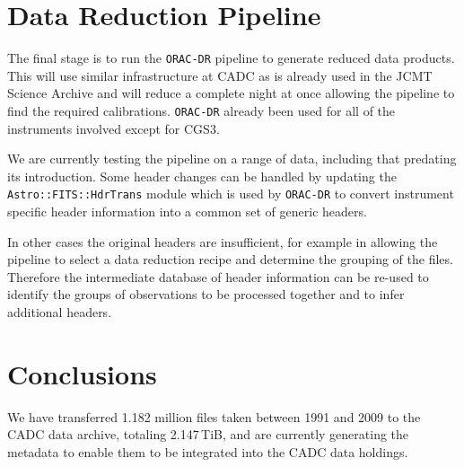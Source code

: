 \documentclass[11pt,twoside]{article}
\begin{document}
\section{Data Reduction Pipeline}

The final stage is to run the \texttt{ORAC-DR} pipeline
\citep{1999ASPC..172...11E,2008AN....329..295C}
to generate reduced
data products.
This will use similar infrastructure at CADC as is already
used in the JCMT Science Archive
\citep{2011ASPC..442..203E}
and will reduce a complete night at once allowing
the pipeline to find the required calibrations.
\texttt{ORAC-DR} already been used for all of the instruments
involved except for CGS3.

We are currently testing the pipeline on a range of data,
including that predating its introduction.
Some header changes can be handled by updating the
\texttt{Astro::FITS::HdrTrans} module
\citep[section 2.2]{2008AN....329..295C}
which is used by \texttt{ORAC-DR} to convert
instrument specific header information into
a common set of generic headers.

In other cases the original headers are insufficient,
for example in allowing the pipeline to
select a data reduction recipe and determine the
grouping of the files.
Therefore the intermediate database of header information
can be re-used to identify
the groups of observations to be processed together and to infer
additional headers.


\section{Conclusions}

We have transferred 1.182 million files taken between 1991 and 2009 to
the CADC data archive, totaling 2.147\,TiB, and are currently generating
the metadata to enable them to be integrated into the CADC data
holdings.


\end{document}
